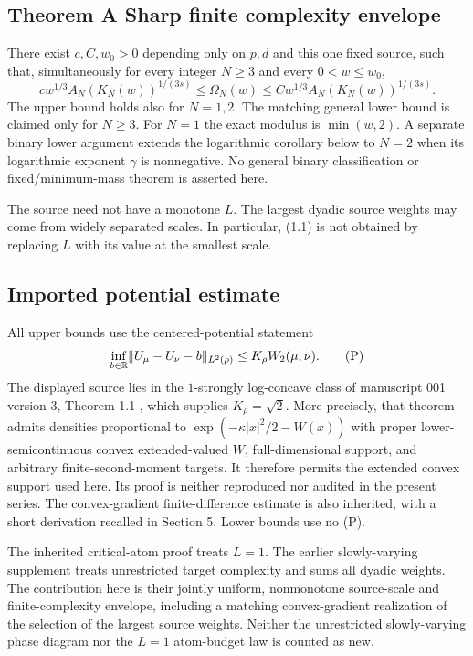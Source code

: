 \subsection*{Theorem A \quad Sharp finite complexity envelope}
There exist $c,C,w_0>0$ depending only on $p,d$ and this one fixed source, such that, simultaneously for every integer $N\ge3$ and every $0<w\le w_0$,
\begin{equation}
 c w^{1/3}A_N(K_N(w))^{1/(3s)}\le\Omega_N(w)
 \le C w^{1/3}A_N(K_N(w))^{1/(3s)}.\tag{1.1}
\end{equation}
The upper bound holds also for $N=1,2$. The matching general lower bound is claimed only for $N\ge3$. For $N=1$ the exact modulus is $\min(w,2)$. A separate binary lower argument extends the logarithmic corollary below to $N=2$ when its logarithmic exponent $\gamma$ is nonnegative. No general binary classification or fixed/minimum-mass theorem is asserted here.

The source need not have a monotone $L$. The largest dyadic source weights may come from widely separated scales. In particular, (1.1) is not obtained by replacing $L$ with its value at the smallest scale.

\subsection*{Imported potential estimate}
All upper bounds use the centered-potential statement
\begin{equation}
 \inf_{b\in\mathbb R}\lVert U_\mu-U_\nu-b\rVert_{L^2(\rho)}
 \le K_\rho W_2(\mu,\nu).\tag{P}
\end{equation}
The displayed source lies in the $1$-strongly log-concave class of manuscript 001 version 3, Theorem 1.1 \cite{potential}, which supplies $K_\rho=\sqrt2$. More precisely, that theorem admits densities proportional to $\exp(-\kappa|x|^2/2-W(x))$ with proper lower-semicontinuous convex extended-valued $W$, full-dimensional support, and arbitrary finite-second-moment targets. It therefore permits the extended convex support used here. Its proof is neither reproduced nor audited in the present series. The convex-gradient finite-difference estimate is also inherited, with a short derivation recalled in Section 5. Lower bounds use no (P).

The inherited critical-atom proof treats $L=1$. The earlier slowly-varying supplement treats unrestricted target complexity and sums all dyadic weights. The contribution here is their jointly uniform, nonmonotone source-scale and finite-complexity envelope, including a matching convex-gradient realization of the selection of the largest source weights. Neither the unrestricted slowly-varying phase diagram nor the $L=1$ atom-budget law is counted as new.


